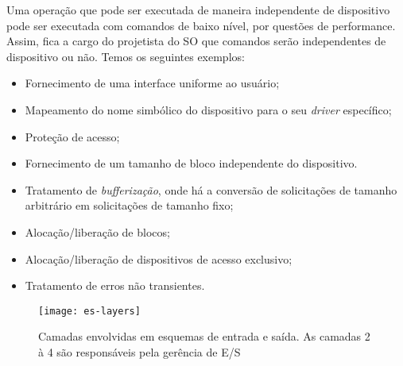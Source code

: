 Uma operação que pode ser executada de maneira independente de dispositivo pode ser executada com comandos de baixo nível, por questões de performance. Assim, fica a cargo do projetista do SO que comandos serão independentes de dispositivo ou não. Temos os seguintes exemplos:
\begin{itemize}
  \item Fornecimento de uma interface uniforme ao usuário;

  \item Mapeamento do nome simbólico do dispositivo para o seu \textit{driver} específico;

  \item Proteção de acesso;

  \item Fornecimento de um tamanho de bloco independente do dispositivo.

  \item Tratamento de \textit{bufferização}, onde há a conversão de solicitações de tamanho arbitrário em solicitações de tamanho fixo;

  \item Alocação/liberação de blocos;

  \item Alocação/liberação de dispositivos de acesso exclusivo;

  \item Tratamento de erros não transientes.
\end{itemize}

\begin{figure}[h]
  \centering
  \texttt{[image: es-layers]}
  \caption{Camadas envolvidas em esquemas de entrada e saída. As camadas 2 à 4 são responsáveis pela gerência de E/S}
  \label{fig:es-layers}
\end{figure}
